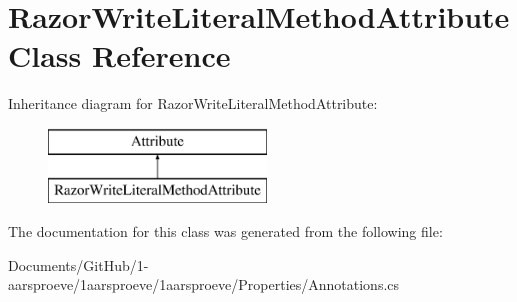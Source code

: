 \hypertarget{class_razor_write_literal_method_attribute}{}\section{Razor\+Write\+Literal\+Method\+Attribute Class Reference}
\label{class_razor_write_literal_method_attribute}
Inheritance diagram for Razor\+Write\+Literal\+Method\+Attribute\+:\begin{figure}[H]
\begin{center}
\leavevmode
\includegraphics[height=2.000000cm]{class_razor_write_literal_method_attribute}
\end{center}
\end{figure}


The documentation for this class was generated from the following file\+:\begin{DoxyCompactItemize}
\item 
Documents/\+Git\+Hub/1-\/aarsproeve/1aarsproeve/1aarsproeve/\+Properties/Annotations.\+cs\end{DoxyCompactItemize}
